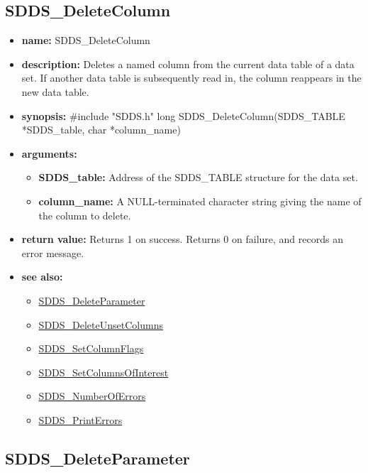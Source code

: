 \documentclass[11pt]{article}
\newcommand{\progref}[1]{\hyperref{SDDS_#1}{{\tt SDDS\_#1} (}{)}{SDDS_#1}}
\begin{document}
\subsection{SDDS\_DeleteColumn}
\label{SDDS_DeleteColumn}

\begin{itemize}
\item {\bf name:}\newline
SDDS\_DeleteColumn
\item {\bf description:}\newline
Deletes a named column from the current data table of a data set. If another data table is subsequently read in, the column reappears in the new data table.
\item {\bf synopsis:} \#include "SDDS.h"\newline
long SDDS\_DeleteColumn(SDDS\_TABLE *SDDS\_table, char *column\_name)
\item {\bf arguments:}
\begin{itemize}
\item {\bf SDDS\_table:} Address of the SDDS\_TABLE structure for the data set.
\item {\bf column\_name:} A NULL-terminated character string giving the name of the column to delete.
\end{itemize}
\item {\bf return value:}\newline
Returns 1 on success. Returns 0 on failure, and records an error message.
\item {\bf see also:}
\begin{itemize}
\item \progref{DeleteParameter}
\item \progref{DeleteUnsetColumns}
\item \progref{SetColumnFlags}
\item \progref{SetColumnsOfInterest}
\item \progref{NumberOfErrors}
\item \progref{PrintErrors}
\end{itemize}
\end{itemize}

\subsection{SDDS\_DeleteParameter}
\label{SDDS_DeleteParameter}
\end{document}
